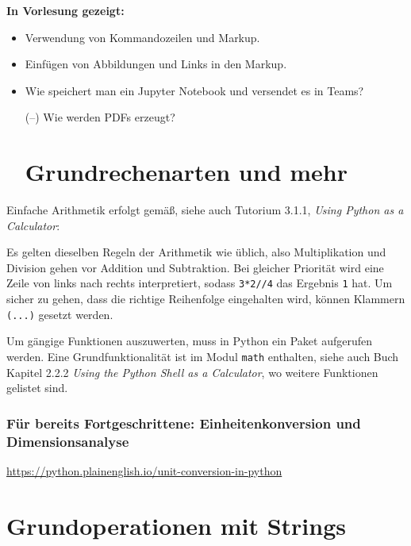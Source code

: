

\noindent
\textbf{In Vorlesung gezeigt:}
\begin{itemize}
\item Verwendung von Kommandozeilen und Markup.
\item Einfügen von Abbildungen und Links in den Markup. 
\item Wie speichert man  ein Jupyter Notebook und versendet es in Teams?
\item[(--)] Wie werden PDFs erzeugt?
\section{Grundrechenarten und mehr}
\end{itemize}

Einfache Arithmetik erfolgt gemäß, siehe auch Tutorium 3.1.1, \textit{Using Python as a Calculator}:


Es gelten dieselben Regeln der Arithmetik wie üblich, also Multiplikation und Division gehen vor Addition und Subtraktion. Bei gleicher Priorität wird eine Zeile von links nach rechts interpretiert, sodass \texttt{3*2//4} das Ergebnis \texttt{1} hat. Um sicher zu gehen, dass die richtige Reihenfolge eingehalten wird, können Klammern \texttt{(...)} gesetzt werden. 

Um gängige Funktionen auszuwerten, muss in Python ein Paket aufgerufen werden. Eine Grundfunktionalität ist im Modul \texttt{math} enthalten, siehe auch Buch Kapitel 2.2.2 \textit{Using the Python Shell as a Calculator}, wo weitere Funktionen gelistet sind. 



\noindent
\subsubsection{Für bereits Fortgeschrittene: Einheitenkonversion und Dimensionsanalyse} 

\href{https://python.plainenglish.io/unit-conversion-in-python-3ee480d4b19c}{https://python.plainenglish.io/unit-conversion-in-python}

\section{Grundoperationen mit Strings}

